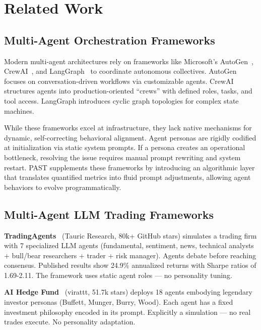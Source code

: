 \documentclass[11pt]{article}
\begin{document}
\section{Related Work}\label{related-work}

\subsection{Multi-Agent Orchestration Frameworks}\label{multi-agent-orchestration-frameworks}

Modern multi-agent architectures rely on frameworks like Microsoft's AutoGen~\citep{autogen2024}, CrewAI~\citep{crewai2024}, and LangGraph~\citep{langgraph2024} to coordinate autonomous collectives. AutoGen focuses on conversation-driven workflows via customizable agents. CrewAI structures agents into production-oriented ``crews'' with defined roles, tasks, and tool access. LangGraph introduces cyclic graph topologies for complex state machines.

While these frameworks excel at infrastructure, they lack native mechanisms for dynamic, self-correcting behavioral alignment. Agent personas are rigidly codified at initialization via static system prompts. If a persona creates an operational bottleneck, resolving the issue requires manual prompt rewriting and system restart. PAST supplements these frameworks by introducing an algorithmic layer that translates quantified metrics into fluid prompt adjustments, allowing agent behaviors to evolve programmatically.

\subsection{Multi-Agent LLM Trading Frameworks}\label{multi-agent-llm-trading-frameworks}

\textbf{TradingAgents}~\citep{xiao2024tradingagents} (Tauric Research, 80k+ GitHub stars) simulates a trading firm with 7 specialized LLM agents (fundamental, sentiment, news, technical analysts + bull/bear researchers + trader + risk manager). Agents debate before reaching consensus. Published results show 24.9\% annualized returns with Sharpe ratios of 1.69-2.11. The framework uses static agent roles --- no personality tuning.

\textbf{AI Hedge Fund}~\citep{singh2025aihedgefund} (virattt, 51.7k stars) deploys 18 agents embodying legendary investor personas (Buffett, Munger, Burry, Wood). Each agent has a fixed investment philosophy encoded in its prompt. Explicitly a simulation --- no real trades execute. No personality adaptation.
\end{document}
